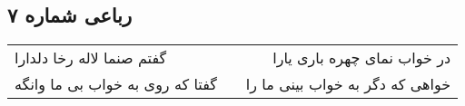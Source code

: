\begin{center}
\section*{رباعی شماره ۷}
\label{sec:sh007}
\begin{longtable}{l p{0.5cm} r}
گفتم صنما لاله رخا دلدارا
&&
در خواب نمای چهره باری یارا
\\
گفتا که روی به خواب بی ما وانگه
&&
خواهی که دگر به خواب بینی ما را
\\
\end{longtable}
\end{center}

